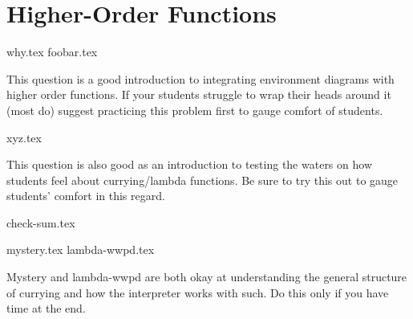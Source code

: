 \documentclass{exam}
\begin{document}
\section{Higher-Order Functions}
\begin{questions}
{why.tex}
{foobar.tex}
\begin{questionmeta}
    This question is a good introduction to integrating environment diagrams with higher order functions. If your students struggle to wrap their heads around it (most do) suggest practicing this problem first to gauge comfort of students. 
\end{questionmeta}

{xyz.tex}
\begin{questionmeta}
    This question is also good as an introduction to testing the waters on how students feel about currying/lambda functions. Be sure to try this out to gauge students' comfort in this regard.
\end{questionmeta}
{check-sum.tex}

{mystery.tex}
{lambda-wwpd.tex}
\begin{questionmeta}
    Mystery and lambda-wwpd are both okay at understanding the general structure of currying and how the interpreter works with such. Do this only if you have time at the end.
\end{questionmeta}
\clearpage

\end{questions}
\end{document}
